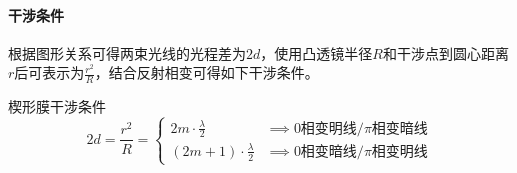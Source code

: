 \paragraph{干涉条件}根据图形关系可得两束光线的光程差为$2d$，使用凸透镜半径$R$和干涉点到圆心距离$r$后可表示为$\frac{r^2}{R}$，结合反射相变可得如下干涉条件。
\begin{itembox}[l]{楔形膜干涉条件}
    \begin{equation*}
        2d=\frac{r^2}{R}=
        \begin{cases}
            2m\cdot\frac{\lambda}{2}&\implies
            \textrm{0相变明线/}\pi\textrm{相变暗线}\\
            (2m+1)\cdot\frac{\lambda}{2}&\implies
            \textrm{0相变暗线/}\pi\textrm{相变明线}
        \end{cases}
    \end{equation*}
\end{itembox}
